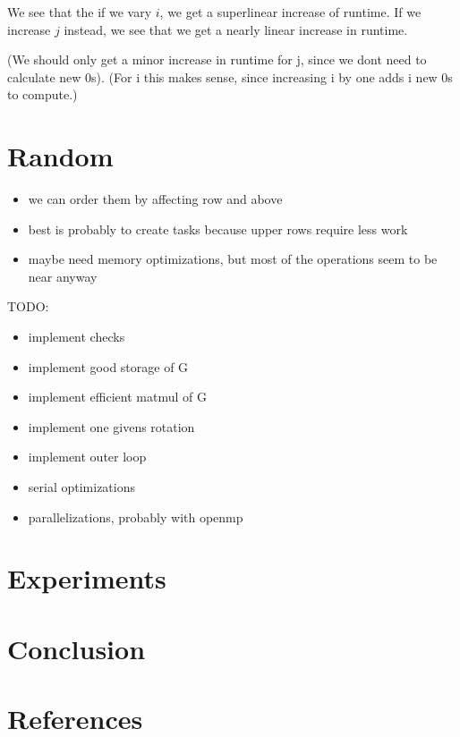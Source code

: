 \documentclass[a4paper]{scrartcl}
\begin{document}
            We see that the if we vary $i$, we get a superlinear increase of
            runtime. If we increase $j$ instead, we see that we get a nearly
            linear increase in runtime.
            
            (We should only get a minor increase in runtime for j, since we dont
            need to calculate new 0s). (For i this makes sense, since increasing
            i by one adds i new 0s to compute.)


\section{Random} 
    \begin{itemize}
        \item we can order them by affecting row and above
        \item best is probably to create tasks because upper rows require less work
        \item maybe need memory optimizations, but most of the operations seem to be near anyway
    \end{itemize}

    TODO:
    \begin{itemize}
        \item implement checks
        \item implement good storage of G
        \item implement efficient matmul of G
        \item implement one givens rotation
        \item implement outer loop
        \item serial optimizations
        \item parallelizations, probably with openmp
    \end{itemize}





\section{Experiments}
\section{Conclusion}
\section{References}
\end{document}

